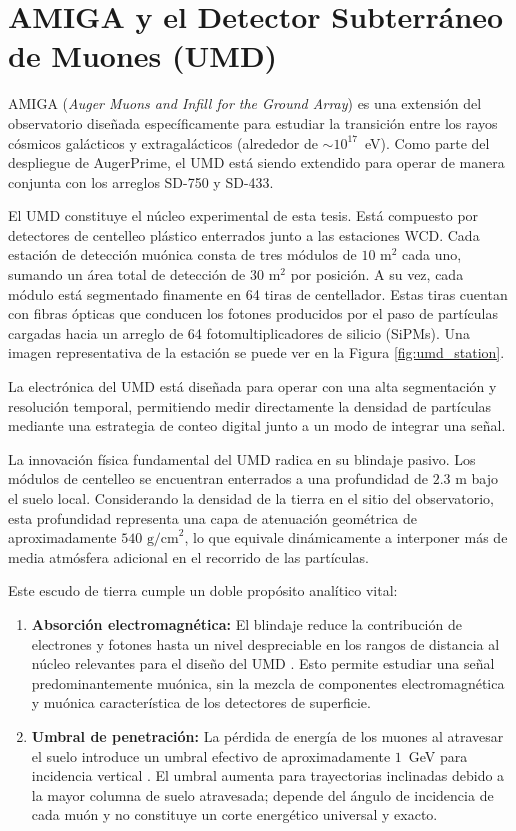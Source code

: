 \section{AMIGA y el Detector Subterráneo de Muones (UMD)}
\label{subsec:umd}

AMIGA (\textit{Auger Muons and Infill for the Ground Array}) es una extensión del observatorio diseñada específicamente para estudiar la transición entre los rayos cósmicos galácticos y extragalácticos (alrededor de $\sim 10^{17}$~eV). Como parte del despliegue de AugerPrime, el UMD está siendo extendido para operar de manera conjunta con los arreglos SD-750 y SD-433.

El UMD constituye el núcleo experimental de esta tesis. Está compuesto por detectores de centelleo plástico enterrados junto a las estaciones WCD. Cada estación de detección muónica consta de tres módulos de $10\text{ m}^2$ cada uno, sumando un área total de detección de $30\text{ m}^2$ por posición. A su vez, cada módulo está segmentado finamente en 64 tiras de centellador. Estas tiras cuentan con fibras ópticas que conducen los fotones producidos por el paso de partículas cargadas hacia un arreglo de 64 fotomultiplicadores de silicio (SiPMs). Una imagen representativa de la estación se puede ver en la Figura \ref{fig:umd_station}.

La electrónica del UMD está diseñada para operar con una alta segmentación y resolución temporal, permitiendo medir directamente la densidad de partículas mediante una estrategia de conteo digital junto a un modo de integrar una señal.

La innovación física fundamental del UMD radica en su blindaje pasivo. Los módulos de centelleo se encuentran enterrados a una profundidad de $2.3\text{ m}$ bajo el suelo local. Considerando la densidad de la tierra en el sitio del observatorio, esta profundidad representa una capa de atenuación geométrica de aproximadamente $540\text{ g/cm}^2$, lo que equivale dinámicamente a interponer más de media atmósfera adicional en el recorrido de las partículas.

Este escudo de tierra cumple un doble propósito analítico vital:

\begin{enumerate}
	\item \textbf{Absorción electromagnética:} El blindaje reduce la contribución de electrones y fotones hasta un nivel despreciable en los rangos de distancia al núcleo relevantes para el diseño del UMD \cite{UMD_Design2016}. Esto permite estudiar una señal predominantemente muónica, sin la mezcla de componentes electromagnética y muónica característica de los detectores de superficie.
	
	\item \textbf{Umbral de penetración:} La pérdida de energía de los muones al atravesar el suelo introduce un umbral efectivo de aproximadamente $1$~GeV para incidencia vertical \cite{auger2020umd_infill}. El umbral aumenta para trayectorias inclinadas debido a la mayor columna de suelo atravesada; depende del ángulo de incidencia de cada muón y no constituye un corte energético universal y exacto.
\end{enumerate}

